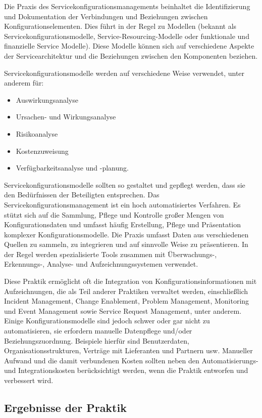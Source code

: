 Die Praxis des Servicekonfigurationsmanagements beinhaltet die Identifizierung
und Dokumentation der Verbindungen und Beziehungen zwischen
Konfigurationselementen. Dies führt in der Regel zu Modellen
(bekannt als Servicekonfigurationsmodelle, Service-Resourcing-Modelle oder
funktionale und finanzielle Service Modelle). Diese Modelle können sich auf
verschiedene Aspekte der Servicearchitektur und die Beziehungen zwischen den
Komponenten beziehen. 

Servicekonfigurationsmodelle werden auf verschiedene Weise verwendet, 
unter anderem für:

\begin{itemize}
    \item Auswirkungsanalyse
    \item Ursachen- und Wirkungsanalyse
    \item Risikoanalyse
    \item Kostenzuweisung
    \item Verfügbarkeitsanalyse und -planung.
\end{itemize}

\noindent
Servicekonfigurationsmodelle sollten so gestaltet und gepflegt werden, dass sie
den Bedürfnissen der Beteiligten entsprechen. 
Das Servicekonfigurationsmanagement ist ein hoch automatisiertes Verfahren. Es
stützt sich auf die Sammlung, Pflege und Kontrolle großer Mengen von
Konfigurationsdaten und umfasst häufig Erstellung, Pflege und Präsentation
komplexer Konfigurationsmodelle. Die Praxis umfasst Daten aus verschiedenen
Quellen zu sammeln, zu integrieren und auf sinnvolle Weise zu präsentieren.
In der Regel werden spezialisierte Tools zusammen mit Überwachungs-,
Erkennungs-, Analyse- und Aufzeichnungssystemen verwendet.

Diese Praktik ermöglicht oft die Integration von Konfigurationsinformationen
mit Aufzeichnungen, die als Teil anderer Praktiken verwaltet werden, einschließlich Incident Management, Change Enablement, Problem Management, Monitoring und 
Event Management sowie Service Request Management, unter anderem. 
Einige Konfigurationsmodelle sind jedoch
schwer oder gar nicht zu automatisieren, sie erfordern manuelle Datenpflege
und/oder Beziehungszuordnung. Beispiele hierfür sind Benutzerdaten,
Organisationsstrukturen, Verträge mit Lieferanten und Partnern usw. Manueller
Aufwand und die damit verbundenen Kosten sollten neben den
Automatisierungs- und Integrationskosten berücksichtigt werden, wenn die
Praktik entworfen und verbessert wird.

\subsection{Ergebnisse der Praktik}
